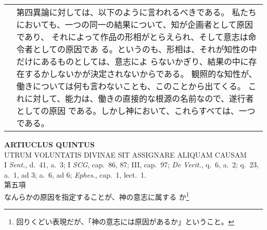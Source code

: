\documentclass[10pt]{jsarticle} %
\begin{document}
\begin{longtable}{p{21em}p{21em}}
&

第四異論に対しては、以下のように言われるべきである。
私たちにおいても、一つの同一の結果について、知が企画者として原因であり、
 それによって作品の形相がとらえられ、そして意志は命令者としての原因であ
 る。というのも、形相は、それが知性の中だけにあるものとしては、意志によ
 らないかぎり、結果の中に存在するかしないかが決定されないからである。
観照的な知性が、働きについては何も言わないことも、このことから出てくる。
これに対して、能力は、働きの直接的な根源の名前なので、遂行者としての原因
 である。しかし神において、これらすべては、一つである。


\end{longtable}
\newpage



\begin{center}
 {\Large {\bf ARTIUCLUS QUINTUS}}\\
 {\large UTRUM VOLUNTATIS DIVINAE SIT ASSIGNARE ALIQUAM CAUSAM}\\
 {\footnotesize I {\itshape Sent.}, d.~41, a.~3; I {\itshape SCG},
 cap.~86, 87; III, cap.~97; {\itshape De Verit.}, q.~6, a.~2; q.~23,
 a.~1, ad 3; a.~6, ad 6; {\itshape Ephes.}, cap.~1, lect.~1.}\\
 {\Large 第五項\\なんらかの原因を指定することが、神の意志に属する
 か}\footnote{回りくどい表現だが、「神の意志には原因があるか」ということ。}
\end{center}
\end{document}
